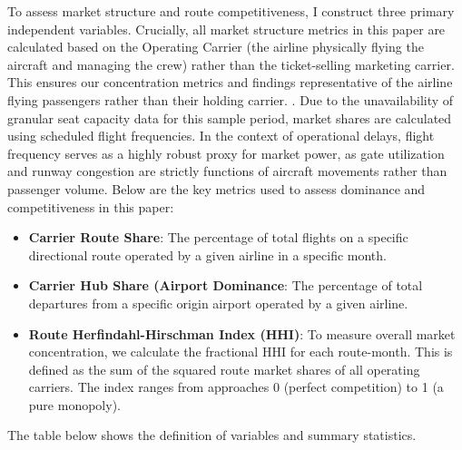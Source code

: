 \documentclass[preprint,12pt,authoryear]{elsarticle}
\begin{document}
To assess market structure and route competitiveness, I construct three primary independent variables. Crucially, all market structure metrics in this paper are calculated based on the Operating Carrier (the airline physically flying the aircraft and managing the crew) rather than the ticket-selling marketing carrier. This ensures our concentration metrics and findings representative of the airline flying passengers rather than their holding carrier.  . Due to the unavailability of granular seat capacity data for this sample period, market shares are calculated using scheduled flight frequencies. In the context of operational delays, flight frequency serves as a highly robust proxy for market power, as gate utilization and runway congestion are strictly functions of aircraft movements rather than passenger volume. Below are the key metrics used to assess dominance and competitiveness in this paper:
\begin{itemize}
    \item \textbf{Carrier Route Share}: The percentage of total flights on a specific directional route operated by a given airline in a specific month.
    \item \textbf{Carrier Hub Share (Airport Dominance}: The percentage of total departures from a specific origin airport operated by a given airline.
    \item \textbf{Route Herfindahl-Hirschman Index (HHI)}: To measure overall market concentration, we calculate the fractional HHI for each route-month. This is defined as the sum of the squared route market shares of all operating carriers. The index ranges from approaches 0 (perfect competition) to 1 (a pure monopoly). 
\end{itemize}

The table below shows the definition of variables and summary statistics.
\end{document}
